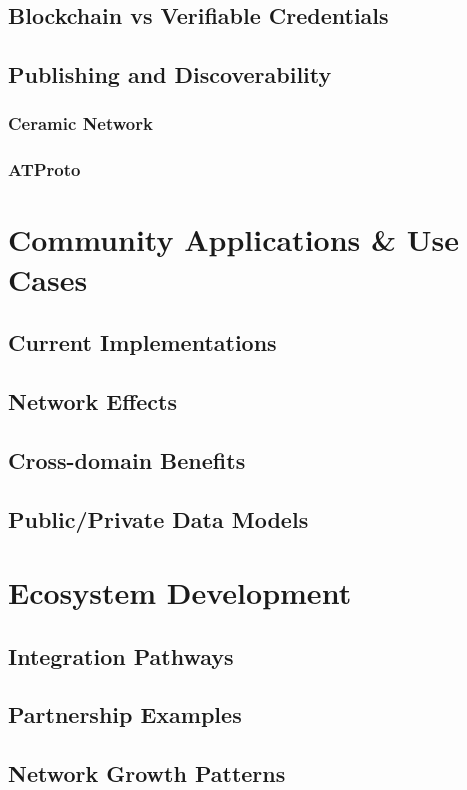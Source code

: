 \documentclass[11pt]{article}
\begin{document}
\subsection{Blockchain vs Verifiable Credentials}
\subsection{Publishing and Discoverability}
\subsubsection{Ceramic Network}
\subsubsection{ATProto}

\section{Community Applications \& Use Cases}
\subsection{Current Implementations}
\subsection{Network Effects}
\subsection{Cross-domain Benefits}
\subsection{Public/Private Data Models}

\section{Ecosystem Development}
\subsection{Integration Pathways}
\subsection{Partnership Examples}
\subsection{Network Growth Patterns}
\end{document}
